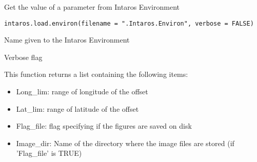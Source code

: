 %
\begin{Description}\relax
Get the value of a parameter from Intaros Environment
\end{Description}
%
\begin{Usage}
\begin{verbatim}
intaros.load.environ(filename = ".Intaros.Environ", verbose = FALSE)
\end{verbatim}
\end{Usage}
%
\begin{Arguments}
\begin{ldescription}
\item[\code{filename}] 
Name given to the Intaros Environment

\item[\code{verbose}] 
Verbose flag

\end{ldescription}
\end{Arguments}
%
\begin{Value}
This function returns a list containing the following items:
\begin{itemize}

\item Long\_lim: range of longitude of the offset
\item Lat\_lim: range of latitude of the offset
\item Flag\_file: flag specifying if the figures are saved on disk
\item Image\_dir: Name of the directory where the image files are stored (if 'Flag\_file' is TRUE)

\end{itemize}

\end{Value}
